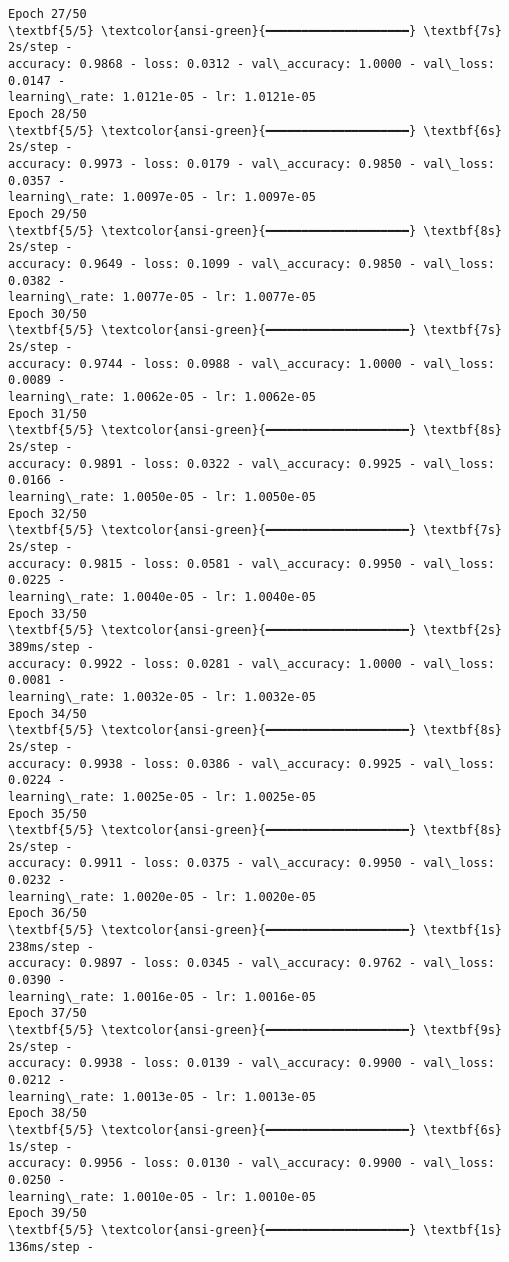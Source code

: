 \documentclass[11pt]{article}
\begin{document}
\begin{Verbatim}[commandchars=\\\{\}]
Epoch 27/50
\textbf{5/5} \textcolor{ansi-green}{━━━━━━━━━━━━━━━━━━━━} \textbf{7s} 2s/step -
accuracy: 0.9868 - loss: 0.0312 - val\_accuracy: 1.0000 - val\_loss: 0.0147 -
learning\_rate: 1.0121e-05 - lr: 1.0121e-05
Epoch 28/50
\textbf{5/5} \textcolor{ansi-green}{━━━━━━━━━━━━━━━━━━━━} \textbf{6s} 2s/step -
accuracy: 0.9973 - loss: 0.0179 - val\_accuracy: 0.9850 - val\_loss: 0.0357 -
learning\_rate: 1.0097e-05 - lr: 1.0097e-05
Epoch 29/50
\textbf{5/5} \textcolor{ansi-green}{━━━━━━━━━━━━━━━━━━━━} \textbf{8s} 2s/step -
accuracy: 0.9649 - loss: 0.1099 - val\_accuracy: 0.9850 - val\_loss: 0.0382 -
learning\_rate: 1.0077e-05 - lr: 1.0077e-05
Epoch 30/50
\textbf{5/5} \textcolor{ansi-green}{━━━━━━━━━━━━━━━━━━━━} \textbf{7s} 2s/step -
accuracy: 0.9744 - loss: 0.0988 - val\_accuracy: 1.0000 - val\_loss: 0.0089 -
learning\_rate: 1.0062e-05 - lr: 1.0062e-05
Epoch 31/50
\textbf{5/5} \textcolor{ansi-green}{━━━━━━━━━━━━━━━━━━━━} \textbf{8s} 2s/step -
accuracy: 0.9891 - loss: 0.0322 - val\_accuracy: 0.9925 - val\_loss: 0.0166 -
learning\_rate: 1.0050e-05 - lr: 1.0050e-05
Epoch 32/50
\textbf{5/5} \textcolor{ansi-green}{━━━━━━━━━━━━━━━━━━━━} \textbf{7s} 2s/step -
accuracy: 0.9815 - loss: 0.0581 - val\_accuracy: 0.9950 - val\_loss: 0.0225 -
learning\_rate: 1.0040e-05 - lr: 1.0040e-05
Epoch 33/50
\textbf{5/5} \textcolor{ansi-green}{━━━━━━━━━━━━━━━━━━━━} \textbf{2s} 389ms/step -
accuracy: 0.9922 - loss: 0.0281 - val\_accuracy: 1.0000 - val\_loss: 0.0081 -
learning\_rate: 1.0032e-05 - lr: 1.0032e-05
Epoch 34/50
\textbf{5/5} \textcolor{ansi-green}{━━━━━━━━━━━━━━━━━━━━} \textbf{8s} 2s/step -
accuracy: 0.9938 - loss: 0.0386 - val\_accuracy: 0.9925 - val\_loss: 0.0224 -
learning\_rate: 1.0025e-05 - lr: 1.0025e-05
Epoch 35/50
\textbf{5/5} \textcolor{ansi-green}{━━━━━━━━━━━━━━━━━━━━} \textbf{8s} 2s/step -
accuracy: 0.9911 - loss: 0.0375 - val\_accuracy: 0.9950 - val\_loss: 0.0232 -
learning\_rate: 1.0020e-05 - lr: 1.0020e-05
Epoch 36/50
\textbf{5/5} \textcolor{ansi-green}{━━━━━━━━━━━━━━━━━━━━} \textbf{1s} 238ms/step -
accuracy: 0.9897 - loss: 0.0345 - val\_accuracy: 0.9762 - val\_loss: 0.0390 -
learning\_rate: 1.0016e-05 - lr: 1.0016e-05
Epoch 37/50
\textbf{5/5} \textcolor{ansi-green}{━━━━━━━━━━━━━━━━━━━━} \textbf{9s} 2s/step -
accuracy: 0.9938 - loss: 0.0139 - val\_accuracy: 0.9900 - val\_loss: 0.0212 -
learning\_rate: 1.0013e-05 - lr: 1.0013e-05
Epoch 38/50
\textbf{5/5} \textcolor{ansi-green}{━━━━━━━━━━━━━━━━━━━━} \textbf{6s} 1s/step -
accuracy: 0.9956 - loss: 0.0130 - val\_accuracy: 0.9900 - val\_loss: 0.0250 -
learning\_rate: 1.0010e-05 - lr: 1.0010e-05
Epoch 39/50
\textbf{5/5} \textcolor{ansi-green}{━━━━━━━━━━━━━━━━━━━━} \textbf{1s} 136ms/step -

\end{Verbatim}
\end{document}
